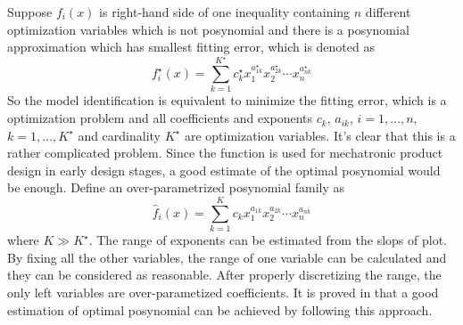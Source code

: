 Suppose $f_i(x)$ is right-hand side of one inequality containing $n$ different optimization variables which is not posynomial and there is a posynomial approximation which has smallest fitting error, which is denoted as $$f_i^\star(x)=\sum_{k=1}^{K^\star} c_k^\star x_1^{{a_{1k}^\star}}x_2^{{a_{2k}^\star}}\cdots x_n^{{a_{nk}^\star}}$$
So the model identification is equivalent to minimize the fitting error, which is a optimization problem and all coefficients and exponents $c_k$, $a_{ik}$, $i=1,\ldots,n$, $k=1,\ldots,K^\star$ and cardinality $K^\star$ are optimization variables. It's clear that this is a rather complicated problem. Since the function is used for mechatronic product design in early design stages, a good estimate of the optimal posynomial would be enough. Define an over-parametrized posynomial family as $$\hat{f}_i(x)=\sum_{k=1}^K c_k x_1^{a_{1k}}x_2^{a_{2k}}\cdots x_n^{a_{nk}}$$ where $K \gg K^\star$. The range of exponents can be estimated from the slops of plot. By fixing all the other variables, the range of one variable can be calculated and they can be considered as reasonable. After properly discretizing the range, the only left variables are over-parametized coefficients. It is proved in \cite{Posynomial2015} that a good estimation of optimal posynomial can be achieved by following this approach.  